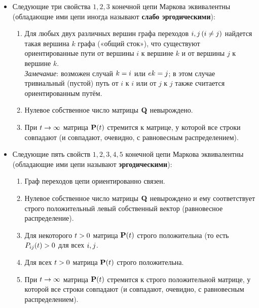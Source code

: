 \documentclass{article}
\begin{document}
\begin{itemize}
	\item Следующие три свойства $1, 2, 3$ конечной цепи Маркова эквивалентны (обладающие ими цепи иногда называют \textbf{слабо эргодическими}):
	\begin{enumerate}
		\item Для любых двух различных вершин графа переходов ${\displaystyle i,j\,(i\neq j)}$ найдется такая вершина $k$ графа («общий сток»), что существуют ориентированные пути от вершины $i$ к вершине $k$ и от вершины $j$ к вершине $k$.\\
		\textit{Замечание}: возможен случай ${\displaystyle k=i}$ или ${\displaystyle e k=j}$; в этом случае тривиальный (пустой) путь от $i$ к $i$ или от $j$ к $j$ также считается ориентированным путём.
		\item Нулевое собственное число матрицы ${\displaystyle \mathbf {Q} }$ невырождено.
		\item При ${\displaystyle t\to \infty }$ матрица ${\displaystyle \mathbf {P} (t)}$ стремится к матрице, у которой все строки совпадают (и совпадают, очевидно, с равновесным распределением).
	\end{enumerate}
	\item Следующие пять свойств $1, 2, 3, 4, 5$ конечной цепи Маркова эквивалентны (обладающие ими цепи называют \textbf{эргодическими}):
	\begin{enumerate}
		\item Граф переходов цепи ориентированно связен.
		\item Нулевое собственное число матрицы ${\displaystyle \mathbf {Q} }$ невырождено и ему соответствует строго положительный левый собственный вектор (равновесное распределение).
		\item Для некоторого ${\displaystyle t>0}$ матрица ${\displaystyle \mathbf {P} (t)}$ строго положительна (то есть ${\displaystyle P_{ij}(t)>0}$ для всех ${\displaystyle i,j}$.
		\item Для всех ${\displaystyle t>0}$ матрица ${\displaystyle \mathbf {P} (t)}$ строго положительна.
		\item При ${\displaystyle t\to \infty }$  матрица ${\displaystyle \mathbf {P} (t)}$ стремится к строго положительной матрице, у которой все строки совпадают (и совпадают, очевидно, с равновесным распределением).
	\end{enumerate}
\end{itemize}
\end{document}
